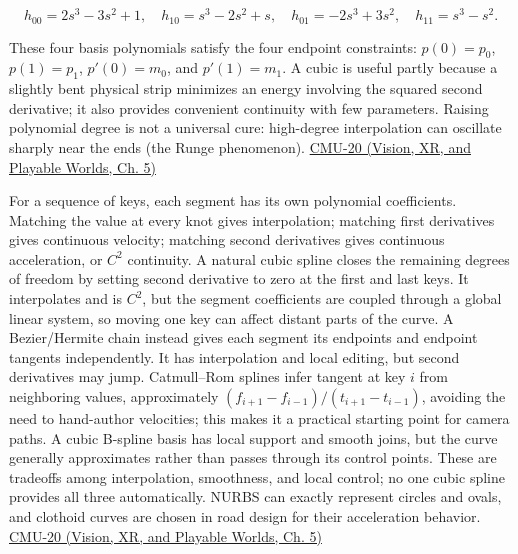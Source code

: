 \[
h_{00}=2s^3-3s^2+1,\quad h_{10}=s^3-2s^2+s,\quad h_{01}=-2s^3+3s^2,\quad h_{11}=s^3-s^2.
\]

These four basis polynomials satisfy the four endpoint constraints: \(p(0)=p_0\), \(p(1)=p_1\), \(p'(0)=m_0\), and \(p'(1)=m_1\). A cubic is useful partly because a slightly bent physical strip minimizes an energy involving the squared second derivative; it also provides convenient continuity with few parameters. Raising polynomial degree is not a universal cure: high-degree interpolation can oscillate sharply near the ends (the Runge phenomenon). \href{../07-Vision-XR-and-Playable-Worlds/main.pdf\#nameddest=04-visual-computing-ii-ch036-cmu-20---introduction-to-animation}{CMU-20 (Vision, XR, and Playable Worlds, Ch. 5)}

For a sequence of keys, each segment has its own polynomial coefficients. Matching the value at every knot gives interpolation; matching first derivatives gives continuous velocity; matching second derivatives gives continuous acceleration, or \(C^2\) continuity. A natural cubic spline closes the remaining degrees of freedom by setting second derivative to zero at the first and last keys. It interpolates and is \(C^2\), but the segment coefficients are coupled through a global linear system, so moving one key can affect distant parts of the curve. A Bezier/Hermite chain instead gives each segment its endpoints and endpoint tangents independently. It has interpolation and local editing, but second derivatives may jump. Catmull--Rom splines infer tangent at key \(i\) from neighboring values, approximately \((f_{i+1}-f_{i-1})/(t_{i+1}-t_{i-1})\), avoiding the need to hand-author velocities; this makes it a practical starting point for camera paths. A cubic B-spline basis has local support and smooth joins, but the curve generally approximates rather than passes through its control points. These are tradeoffs among interpolation, smoothness, and local control; no one cubic spline provides all three automatically. NURBS can exactly represent circles and ovals, and clothoid curves are chosen in road design for their acceleration behavior. \href{../07-Vision-XR-and-Playable-Worlds/main.pdf\#nameddest=04-visual-computing-ii-ch036-cmu-20---introduction-to-animation}{CMU-20 (Vision, XR, and Playable Worlds, Ch. 5)}

